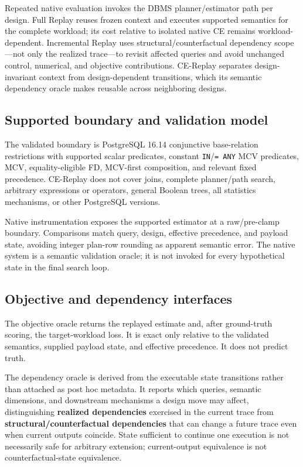 \documentclass[sigconf,nonacm]{acmart}
\begin{document}
Repeated native evaluation invokes the DBMS planner/estimator path per design. Full Replay reuses frozen context and executes supported semantics for the complete workload; its cost relative to isolated native CE remains workload-dependent. Incremental Replay uses structural/counterfactual dependency scope---not only the realized trace---to revisit affected queries and avoid unchanged control, numerical, and objective contributions. CE-Replay separates design-invariant context from design-dependent transitions, which its semantic dependency oracle makes reusable across neighboring designs.

\subsection{Supported boundary and validation model}

The validated boundary is PostgreSQL 16.14 conjunctive base-relation restrictions with supported scalar predicates, constant \texttt{IN}/\texttt{= ANY} MCV predicates, MCV, equality-eligible FD, MCV-first composition, and relevant fixed precedence. CE-Replay does not cover joins, complete planner/path search, arbitrary expressions or operators, general Boolean trees, all statistics mechanisms, or other PostgreSQL versions.

Native instrumentation exposes the supported estimator at a raw/pre-clamp boundary. Comparisons match query, design, effective precedence, and payload state, avoiding integer plan-row rounding as apparent semantic error. The native system is a semantic validation oracle; it is not invoked for every hypothetical state in the final search loop.

\subsection{Objective and dependency interfaces}

The objective oracle returns the replayed estimate and, after ground-truth scoring, the target-workload loss. It is exact only relative to the validated semantics, supplied payload state, and effective precedence. It does not predict truth.

The dependency oracle is derived from the executable state transitions rather than attached as post hoc metadata. It reports which queries, semantic dimensions, and downstream mechanisms a design move may affect, distinguishing \textbf{realized dependencies} exercised in the current trace from \textbf{structural/counterfactual dependencies} that can change a future trace even when current outputs coincide. State sufficient to continue one execution is not necessarily safe for arbitrary extension; current-output equivalence is not counterfactual-state equivalence.
\end{document}
